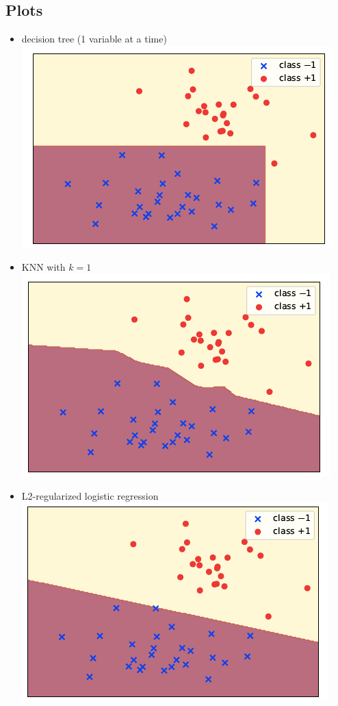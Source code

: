 \documentclass[10pt,landscape,a4paper]{article}
\begin{document}
\begin{multicols*}{5}
\section{Plots}
\begin{itemize}
    \item decision tree (1 variable at a time) \\
    \includegraphics[scale=0.3]{decision_tree_plot}
    \item KNN with \(k=1\) \\
    \includegraphics[scale=0.3]{knn_plot}
    \item L2-regularized logistic regression \\
    \includegraphics[scale=0.3]{l2_regularized_logistic_regression_plot}

\end{itemize}
\end{multicols*}
\end{document}
